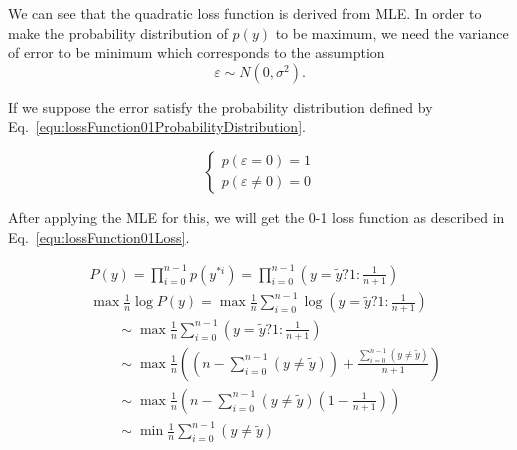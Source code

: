 \documentclass[runningheads,openany]{xhlPaper}
\begin{document}
We can see that the quadratic loss function is derived from MLE. In order to make the probability distribution of $p\left(y\right)$ to be maximum, we need the variance of error to be minimum which corresponds to the assumption
\begin{displaymath}
{\varepsilon  \sim N\left( {0,{\sigma ^2}} \right)}.
\end{displaymath}

If we suppose the error satisfy the probability distribution defined by Eq.~\ref{equ:lossFunction01ProbabilityDistribution}.

\begin{equation}
\label{equ:lossFunction01ProbabilityDistribution}
\left\{ {\begin{array}{*{20}{c}}
{p\left( {\varepsilon  = 0} \right) = 1}\\
{p\left( {\varepsilon  \ne 0} \right) = 0}
\end{array}} \right.
\end{equation}

After applying the MLE for this, we will get the 0-1 loss function as described in Eq.~\ref{equ:lossFunction01Loss}.

\begin{equation}
\label{equ:lossFunction01Loss}
\begin{aligned}
&P\left( y \right) = \prod\limits_{i = 0}^{n - 1} {p\left( {{y^{*i}}} \right)}  = \prod\limits_{i = 0}^{n - 1} {\left( {y = \tilde y?1:\frac{1}{{n + 1}}} \right)} \\
&\max \frac{1}{n}\log P\left( y \right) = \max \frac{1}{n}\sum\limits_{i = 0}^{n - 1} {\log \left( {y = \tilde y?1:\frac{1}{{n + 1}}} \right)} \\
 &\quad\quad\sim \max \frac{1}{n}\sum\limits_{i = 0}^{n - 1} {\left( {y = \tilde y?1:\frac{1}{{n + 1}}} \right)} \\
 &\quad\quad\sim \max \frac{1}{n}\left( {\left( {n - \sum\limits_{i = 0}^{n - 1} {\left( {y \ne \tilde y} \right)} } \right) + \frac{{\sum\limits_{i = 0}^{n - 1} {\left( {y \ne \tilde y} \right)} }}{{n + 1}}} \right)\\
 &\quad\quad\sim \max \frac{1}{n}\left( {n - \sum\limits_{i = 0}^{n - 1} {\left( {y \ne \tilde y} \right)} \left( {1 - \frac{1}{{n + 1}}} \right)} \right)\\
 &\quad\quad\sim \min \frac{1}{n}\sum\limits_{i = 0}^{n - 1} {\left( {y \ne \tilde y} \right)} 
\end{aligned}
\end{equation}
\end{document}
